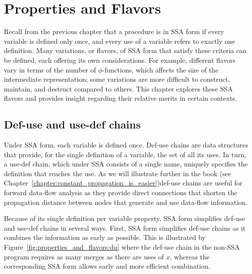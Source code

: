 \chapter{Properties and Flavors }
\label{chapter:properties_and_flavours}




Recall from the previous chapter that a procedure is in SSA form if every variable is defined only once, and every use of a variable refers to exactly one definition. 
Many variations, or flavors, of SSA form that satisfy these criteria can be defined, each offering its own considerations. 
For example, different flavors vary in terms of the number of $\phi$-functions, which affects the size of the intermediate representation; 
some variations are more difficult to construct, maintain, and destruct compared to others. 
This chapter explores these SSA flavors and provides insight regarding their relative merits in certain contexts.

\section{Def-use and use-def chains}
\label{sec:properties_and_flavours:def-use}
Under SSA form, each variable is defined once. 
Def-use chains are data structures that provide, for the single definition of a variable, the set of all its uses. 
In turn, a use-def chain, which under SSA consists of a single name, uniquely specifies the definition that reaches the use. 
As we will illustrate further in the book \ifconstantprop (see Chapter~\ref{chapter:constant_propagation_is_easier})\fi def-use chains are useful for forward data-flow analysis as they provide direct connections that shorten the propagation distance between nodes that generate and use data-flow information.

Because of its single definition per variable property, SSA form simplifies def-use and use-def chains in several ways. 
First, SSA form simplifies def-use chains as it combines the information as early as possible. 
This is illustrated by Figure~\ref{fig:properties_and_flavors:du} where the def-use chain in the non-SSA program requires as many merges as there are uses of $x$, whereas the corresponding SSA form allows early and more efficient combination.

